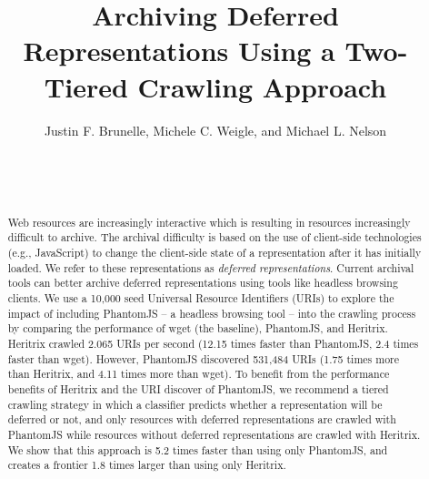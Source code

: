 \documentclass{ipres_proc_article-sp}
\begin{document}
\title{Archiving Deferred Representations Using a Two-Tiered Crawling Approach}


\author{
\alignauthor
Justin F. Brunelle, Michele C. Weigle, and Michael L. Nelson\\
       \\
       \\
       \\
}

\maketitle
\begin{abstract}
Web resources are increasingly interactive which is resulting in resources increasingly difficult to archive. The archival difficulty is based on the use of client-side technologies (e.g., JavaScript) to change the client-side state of a representation after it has initially loaded. We refer to these representations as \emph{deferred representations}. Current archival tools can better archive deferred representations using tools like headless browsing clients. 
We use a 10,000 seed Universal Resource Identifiers (URIs) to explore the impact of including PhantomJS -- a headless browsing tool -- into the crawling process by comparing the performance of wget (the baseline), PhantomJS, and Heritrix. Heritrix crawled 2.065 URIs per second (12.15 times faster than PhantomJS, 2.4 times faster than wget). However, PhantomJS discovered 531,484 URIs (1.75 times more than Heritrix, and 4.11 times more than wget). To benefit from the performance benefits of Heritrix and the URI discover of PhantomJS, we recommend a tiered crawling strategy in which a classifier predicts whether a representation will be deferred or not, and only resources with deferred representations are crawled with PhantomJS while resources without deferred representations are crawled with Heritrix. We show that this approach is 5.2 times faster than using only PhantomJS, and creates a frontier 1.8 times larger than using only Heritrix.
\end{abstract}

\end{document}
